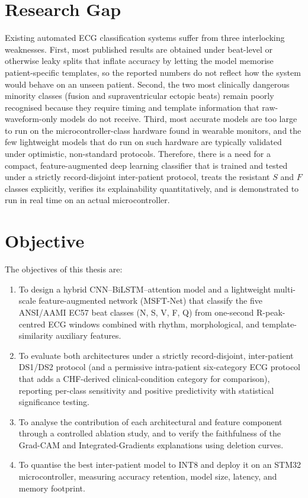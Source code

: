 \section{Research Gap}
\label{sec:gap}

Existing automated ECG classification systems suffer from three
interlocking weaknesses. First, most published results are obtained under
beat-level or otherwise leaky splits that inflate accuracy by letting the
model memorise patient-specific templates, so the reported numbers do not
reflect how the system would behave on an unseen patient. Second, the two
most clinically dangerous minority classes (fusion and supraventricular
ectopic beats) remain poorly recognised because they require timing and
template information that raw-waveform-only models do not receive. Third,
most accurate models are too large to run on the microcontroller-class
hardware found in wearable monitors, and the few lightweight models that do
run on such hardware are typically validated under optimistic, non-standard
protocols. Therefore, there is a need for a compact, feature-augmented deep
learning classifier that is trained and tested under a strictly
record-disjoint inter-patient protocol, treats the resistant $S$ and $F$
classes explicitly, verifies its explainability quantitatively, and is
demonstrated to run in real time on an actual microcontroller.


\section{Objective}
\label{sec:objectives}

The objectives of this thesis are:

\begin{enumerate}
  \item To design a hybrid CNN--BiLSTM--attention model and a lightweight
        multi-scale feature-augmented network (MSFT-Net) that classify the
        five ANSI/AAMI EC57 beat classes (N, S, V, F, Q) from one-second
        R-peak-centred ECG windows combined with rhythm, morphological, and
        template-similarity auxiliary features.
  \item To evaluate both architectures under a strictly record-disjoint,
        inter-patient DS1/DS2 protocol (and a permissive intra-patient
        six-category ECG protocol that adds a CHF-derived clinical-condition
        category for comparison), reporting per-class sensitivity
        and positive predictivity with statistical significance testing.
  \item To analyse the contribution of each architectural and feature
        component through a controlled ablation study, and to verify the
        faithfulness of the Grad-CAM and Integrated-Gradients explanations
        using deletion curves.
  \item To quantise the best inter-patient model to INT8 and deploy it on an
        STM32 microcontroller, measuring accuracy retention, model size,
        latency, and memory footprint.
\end{enumerate}


